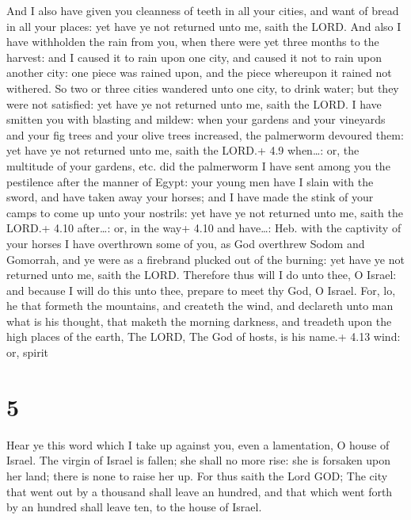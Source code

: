  And I also have given you cleanness of teeth in all your
cities, and want of bread in all your places: yet have ye not returned
unto me, saith the LORD.  And also I have withholden the
rain from you, when there were yet three months to the harvest: and I
caused it to rain upon one city, and caused it not to rain upon another
city: one piece was rained upon, and the piece whereupon it rained not
withered.  So two or three cities wandered unto one city, to
drink water; but they were not satisfied: yet have ye not returned unto
me, saith the LORD.  I have smitten you with blasting and
mildew: when your gardens and your vineyards and your fig trees and your
olive trees increased, the palmerworm devoured them: yet have ye not
returned unto me, saith the LORD.+ 4.9 when\ldots: or, the multitude of
your gardens, etc. did the palmerworm  I have sent among
you the pestilence after the manner of Egypt: your young men have I
slain with the sword, and have taken away your horses; and I have made
the stink of your camps to come up unto your nostrils: yet have ye not
returned unto me, saith the LORD.+ 4.10 after\ldots: or, in the way+
4.10 and have\ldots: Heb. with the captivity of your horses
 I have overthrown some of you, as God overthrew Sodom and
Gomorrah, and ye were as a firebrand plucked out of the burning: yet
have ye not returned unto me, saith the LORD.  Therefore
thus will I do unto thee, O Israel: and because I will do this unto
thee, prepare to meet thy God, O Israel.  For, lo, he that
formeth the mountains, and createth the wind, and declareth unto man
what is his thought, that maketh the morning darkness, and treadeth upon
the high places of the earth, The LORD, The God of hosts, is his name.+
4.13 wind: or, spirit

\hypertarget{section-4}{%
\section{5}\label{section-4}}

 Hear ye this word which I take up against you, even a
lamentation, O house of Israel.  The virgin of Israel is
fallen; she shall no more rise: she is forsaken upon her land; there is
none to raise her up.  For thus saith the Lord GOD; The city
that went out by a thousand shall leave an hundred, and that which went
forth by an hundred shall leave ten, to the house of Israel.

